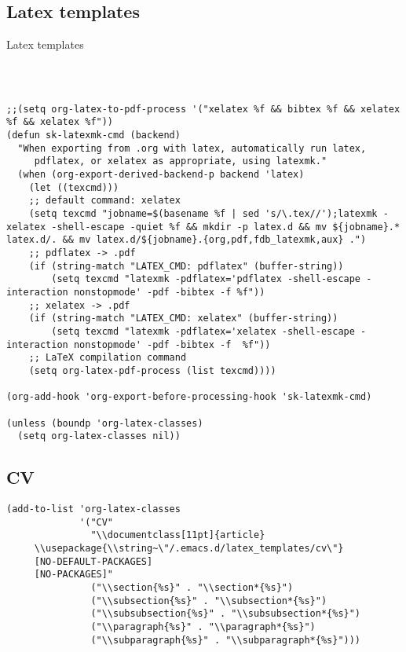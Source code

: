 \documentclass[12pt]{article}
\begin{document}
\subsection{Latex templates}
\label{sec:orgcf56e66}
Latex templates
\begin{verbatim}



;;(setq org-latex-to-pdf-process '("xelatex %f && bibtex %f && xelatex %f && xelatex %f"))
(defun sk-latexmk-cmd (backend)
  "When exporting from .org with latex, automatically run latex,
     pdflatex, or xelatex as appropriate, using latexmk."
  (when (org-export-derived-backend-p backend 'latex)
    (let ((texcmd)))
    ;; default command: xelatex
    (setq texcmd "jobname=$(basename %f | sed 's/\.tex//');latexmk -xelatex -shell-escape -quiet %f && mkdir -p latex.d && mv ${jobname}.* latex.d/. && mv latex.d/${jobname}.{org,pdf,fdb_latexmk,aux} .")
    ;; pdflatex -> .pdf
    (if (string-match "LATEX_CMD: pdflatex" (buffer-string))
        (setq texcmd "latexmk -pdflatex='pdflatex -shell-escape -interaction nonstopmode' -pdf -bibtex -f %f"))
    ;; xelatex -> .pdf
    (if (string-match "LATEX_CMD: xelatex" (buffer-string))
        (setq texcmd "latexmk -pdflatex='xelatex -shell-escape -interaction nonstopmode' -pdf -bibtex -f  %f"))
    ;; LaTeX compilation command
    (setq org-latex-pdf-process (list texcmd))))

(org-add-hook 'org-export-before-processing-hook 'sk-latexmk-cmd)

(unless (boundp 'org-latex-classes)
  (setq org-latex-classes nil))
\end{verbatim}

\subsection{CV}
\label{sec:orgffa0f29}

\begin{verbatim}
(add-to-list 'org-latex-classes
             '("CV"
               "\\documentclass[11pt]{article}
     \\usepackage{\\string~\"/.emacs.d/latex_templates/cv\"}
     [NO-DEFAULT-PACKAGES]
     [NO-PACKAGES]"
               ("\\section{%s}" . "\\section*{%s}")
               ("\\subsection{%s}" . "\\subsection*{%s}")
               ("\\subsubsection{%s}" . "\\subsubsection*{%s}")
               ("\\paragraph{%s}" . "\\paragraph*{%s}")
               ("\\subparagraph{%s}" . "\\subparagraph*{%s}")))
\end{verbatim}
\end{document}
